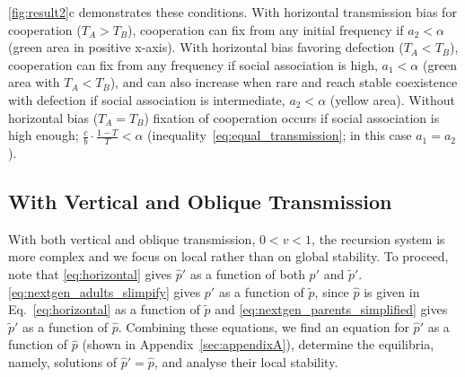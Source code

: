 \documentclass[12pt]{extarticle}
\begin{document}
{\autoref{fig:result2}c demonstrates these conditions.
With horizontal transmission bias for cooperation ($T_A>T_B$), cooperation can fix from any initial frequency if $a_2<\alpha$ (green area in positive x-axis). 
With horizontal bias favoring defection ($T_A<T_B$), cooperation can fix from any frequency if social association is high, $a_1<\alpha$ (green area with $T_A<T_B$), and can also increase when rare and reach stable coexistence with defection if social association is intermediate, $a_2<\alpha$ (yellow area).
Without horizontal bias ($T_A=T_B$) fixation of cooperation occurs if social association is high enough; $\frac{c}{b} \cdot \frac{1-T}{T} < \alpha$ (inequality~\ref{eq:equal_transmission}; in this case $a_1=a_2$).



\subsection*{With Vertical and Oblique Transmission}

With both vertical and oblique transmission, $0<v<1$, the recursion system is more complex
and we focus on local rather than on global stability.
To proceed,  note that 
\autoref{eq:horizontal} gives $\hat{p}'$ as a function of both $p'$ and $\tilde{p}'$.
\autoref{eq:nextgen_adults_slimpify} gives $p'$ as a function of $\tilde{p}$, since $\hat{p}$ is given in Eq.\ \ref{eq:horizontal} as a function of $\tilde{p}$ and 
\autoref{eq:nextgen_parents_simplified} gives $\tilde{p}'$ as a function of $\hat{p}$. 
Combining these equations, we find an equation for $\hat{p}'$ as a function of $\hat{p}$ (shown in Appendix~\autoref{sec:appendixA}),
determine the equilibria, namely, solutions of $\hat{p}' = \hat{p}$, and analyse their local stability.

}
\end{document}
